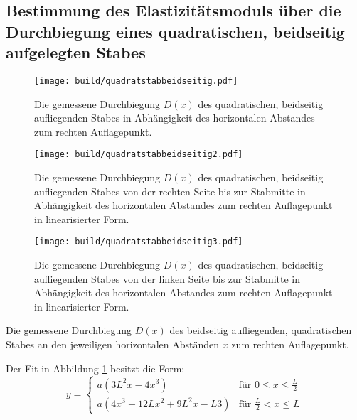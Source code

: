 \subsection{Bestimmung des Elastizitätsmoduls über die Durchbiegung eines quadratischen, beidseitig aufgelegten Stabes}

\begin{figure}
	\centering
	\caption{Die gemessene Durchbiegung $D(x)$ des quadratischen, beidseitig aufliegenden Stabes
	 in Abhängigkeit des horizontalen Abstandes zum rechten Auflagepunkt.}
	\texttt{[image: build/quadratstabbeidseitig.pdf]}
	\label{fig:beidseitig}
\end{figure}
\begin{figure}
	\centering
	\caption{Die gemessene Durchbiegung $D(x)$ des quadratischen, beidseitig aufliegenden Stabes von der rechten Seite bis zur Stabmitte
	 in Abhängigkeit des horizontalen Abstandes zum rechten Auflagepunkt in linearisierter Form.}
	\texttt{[image: build/quadratstabbeidseitig2.pdf]}
	\label{fig:beidseitiglinear1}
\end{figure}
\begin{figure}
	\centering
	\caption{Die gemessene Durchbiegung $D(x)$ des quadratischen, beidseitig aufliegenden Stabes von der linken Seite bis zur Stabmitte
	 in Abhängigkeit des horizontalen Abstandes zum rechten Auflagepunkt in linearisierter Form.}
	\texttt{[image: build/quadratstabbeidseitig3.pdf]}
	\label{fig:beidseitiglinear2}
\end{figure}
\begin{table}
	\caption{Die gemessene Durchbiegung $D(x)$ des beidseitig aufliegenden, quadratischen Stabes an den jeweiligen horizontalen Abständen $x$ zum rechten Auflagepunkt.}
	\begin{minipage}[c]{0.5\textwidth}
		\centering
		
	\end{minipage}
	\begin{minipage}[c]{0.5\textwidth}
		\centering
		
	\end{minipage}
\end{table}
Der Fit in Abbildung \ref{fig:beidseitig} besitzt die Form:
\begin{equation}
	y =
	\begin{cases}
	a\left(3L^2 x-4x^3\right)& \text{für }0\leq x \leq \frac{L}{2} \\
	a\left(4 x^3 -12 L x^2 + 9 L^2 x -L 3 \right)& \text{für }\frac{L}{2} < x \leq L
	\end{cases} \label{FunktionBeidseitig}
\end{equation}
